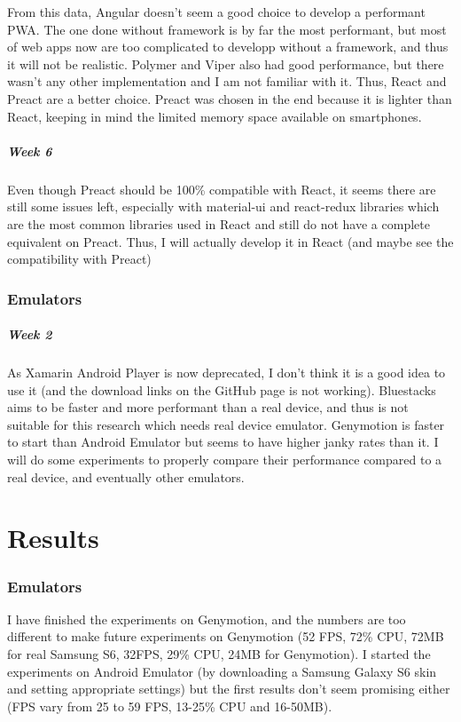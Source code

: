\documentclass{kththesis}
\begin{document}
From this data, Angular doesn't seem a good choice to develop a performant PWA. The one done without framework is by far the most performant, but most of web apps now are too complicated to developp without a framework, and thus it will not be realistic. Polymer and Viper also had good performance, but there wasn't any other implementation and I am not familiar with it. Thus, React and Preact are a better choice. Preact was chosen in the end because it is lighter than React, keeping in mind the limited memory space available on smartphones. 

\paragraph{Week 6}
Even though Preact should be 100\% compatible with React, it seems there are still some issues left, especially with material-ui and react-redux libraries which are the most common libraries used in React and still do not have a complete equivalent on Preact. Thus, I will actually develop it in React (and maybe see the compatibility with Preact)


\subsection{Emulators}
\paragraph{Week 2}
As Xamarin Android Player is now deprecated, I don't think it is a good idea to use it (and the download links on the GitHub page is not working). Bluestacks aims to be faster and more performant than  a real device, and thus is not suitable for this research which needs real device emulator. Genymotion is faster to start than Android Emulator but seems to have higher janky rates than it. I will do some experiments to properly compare their performance compared to a real device, and eventually other emulators.

\fi


\chapter{Results}
\subsection{Emulators}
I have finished the experiments on Genymotion, and the numbers are too different to make future experiments on Genymotion (52 FPS, 72\% CPU, 72MB for real Samsung S6, 32FPS, 29\% CPU, 24MB for Genymotion). I started the experiments on Android Emulator (by downloading a Samsung Galaxy S6 skin and setting appropriate settings) but the first results don't seem promising either (FPS vary from 25 to 59 FPS, 13-25\% CPU and 16-50MB).
\end{document}

